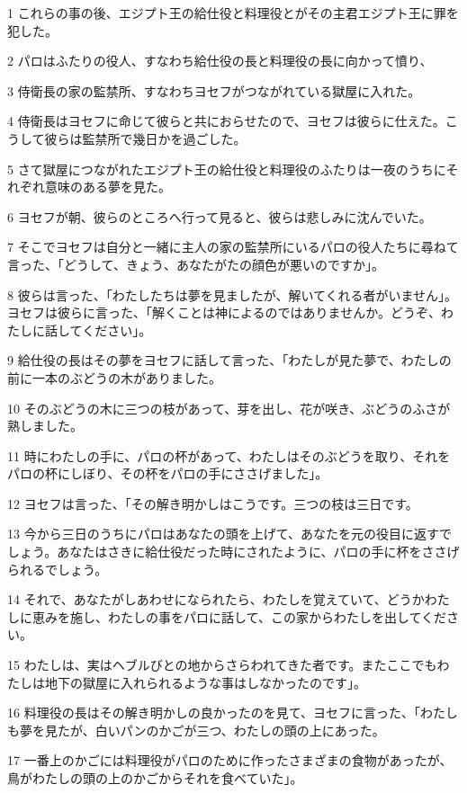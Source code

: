 \par 1 これらの事の後、エジプト王の給仕役と料理役とがその主君エジプト王に罪を犯した。
\par 2 パロはふたりの役人、すなわち給仕役の長と料理役の長に向かって憤り、
\par 3 侍衛長の家の監禁所、すなわちヨセフがつながれている獄屋に入れた。
\par 4 侍衛長はヨセフに命じて彼らと共におらせたので、ヨセフは彼らに仕えた。こうして彼らは監禁所で幾日かを過ごした。
\par 5 さて獄屋につながれたエジプト王の給仕役と料理役のふたりは一夜のうちにそれぞれ意味のある夢を見た。
\par 6 ヨセフが朝、彼らのところへ行って見ると、彼らは悲しみに沈んでいた。
\par 7 そこでヨセフは自分と一緒に主人の家の監禁所にいるパロの役人たちに尋ねて言った、「どうして、きょう、あなたがたの顔色が悪いのですか」。
\par 8 彼らは言った、「わたしたちは夢を見ましたが、解いてくれる者がいません」。ヨセフは彼らに言った、「解くことは神によるのではありませんか。どうぞ、わたしに話してください」。
\par 9 給仕役の長はその夢をヨセフに話して言った、「わたしが見た夢で、わたしの前に一本のぶどうの木がありました。
\par 10 そのぶどうの木に三つの枝があって、芽を出し、花が咲き、ぶどうのふさが熟しました。
\par 11 時にわたしの手に、パロの杯があって、わたしはそのぶどうを取り、それをパロの杯にしぼり、その杯をパロの手にささげました」。
\par 12 ヨセフは言った、「その解き明かしはこうです。三つの枝は三日です。
\par 13 今から三日のうちにパロはあなたの頭を上げて、あなたを元の役目に返すでしょう。あなたはさきに給仕役だった時にされたように、パロの手に杯をささげられるでしょう。
\par 14 それで、あなたがしあわせになられたら、わたしを覚えていて、どうかわたしに恵みを施し、わたしの事をパロに話して、この家からわたしを出してください。
\par 15 わたしは、実はヘブルびとの地からさらわれてきた者です。またここでもわたしは地下の獄屋に入れられるような事はしなかったのです」。
\par 16 料理役の長はその解き明かしの良かったのを見て、ヨセフに言った、「わたしも夢を見たが、白いパンのかごが三つ、わたしの頭の上にあった。
\par 17 一番上のかごには料理役がパロのために作ったさまざまの食物があったが、鳥がわたしの頭の上のかごからそれを食べていた」。
